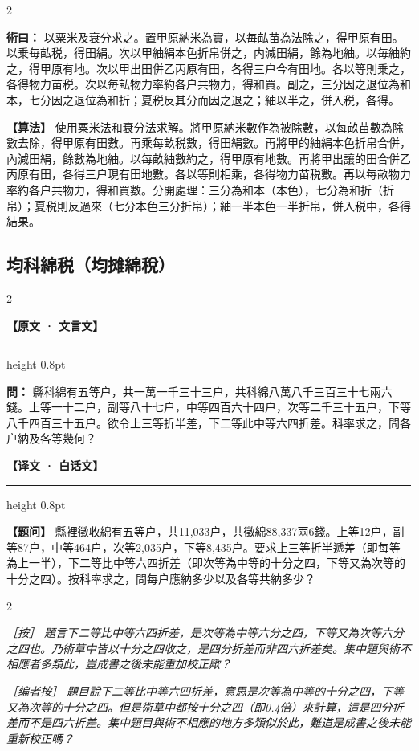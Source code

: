 \documentclass[11pt,a4paper]{article}
\newcommand{\ClassicalQuestion}[1]{\par\noindent\textbf{\color{problemcolor}問：}#1\par}
\newcommand{\ClassicalMethod}[1]{\par\noindent\textbf{\color{methodcolor}術曰：}#1\par}
\newcommand{\ClassicalNote}[1]{\par\noindent\textit{［按］#1}\par}
\newcommand{\ModernQuestion}[1]{\par\noindent\textbf{\color{modernlabel}【题问】}#1\par}
\newcommand{\ModernMethod}[1]{\par\noindent\textbf{\color{methodcolor}【算法】}#1\par}
\newcommand{\ModernNote}[1]{\par\noindent\textit{\color{notecolor}［编者按］#1}\par}
\newcommand{\ClassicalHeader}{%
  \begin{center}\textbf{\color{headerclassical}【原文 · 文言文】}\end{center}
  \vspace{-0.5em}
  \hrule height 0.8pt
  \vspace{0.5em}
}
\newcommand{\ModernHeader}{%
  \begin{center}\textbf{\color{headermodern}【译文 · 白话文】}\end{center}
  \vspace{-0.5em}
  \hrule height 0.8pt
  \vspace{0.5em}
}
\begin{document}
\begin{paracol}{2}

\ClassicalMethod{%
以粟米及衰分求之。置甲原納米為實，以毎畆苗為法除之，得甲原有田。以乗毎畆税，得田絹。次以甲紬絹本色折帛併之，内減田絹，餘為地紬。以毎紬約之，得甲原有地。次以甲出田併乙丙原有田，各得三户今有田地。各以等則乗之，各得物力苗税。次以毎畆物力率約各户共物力，得和買。副之，三分因之退位為和本，七分因之退位為和折；夏税反其分而因之退之；紬以半之，併入税，各得。}

\switchcolumn

\ModernMethod{%
使用粟米法和衰分法求解。將甲原納米數作為被除數，以每畝苗數為除數去除，得甲原有田數。再乘每畝税數，得田絹數。再將甲的紬絹本色折帛合併，內減田絹，餘數為地紬。以每畝紬數約之，得甲原有地數。再將甲出讓的田合併乙丙原有田，各得三户現有田地數。各以等則相乘，各得物力苗税數。再以每畝物力率約各户共物力，得和買數。分開處理：三分為和本（本色），七分為和折（折帛）；夏税則反過來（七分本色三分折帛）；紬一半本色一半折帛，併入税中，各得結果。
}

\end{paracol}

\newpage
\subsection*{\color{sectioncolor}均科綿税（均摊綿稅）}

\begin{paracol}{2}

\ClassicalHeader

\ClassicalQuestion{%
縣科綿有五等户，共一萬一千三十三户，共科綿八萬八千三百三十七兩六錢。上等一十二户，副等八十七户，中等四百六十四户，次等二千三十五户，下等八千四百三十五户。欲令上三等折半差，下二等此中等六四折差。科率求之，問各户納及各等幾何？}

\switchcolumn

\ModernHeader

\ModernQuestion{%
縣裡徵收綿有五等户，共11,033户，共徵綿88,337兩6錢。上等12户，副等87户，中等464户，次等2,035户，下等8,435户。要求上三等折半遞差（即每等為上一半），下二等比中等六四折差（即次等為中等的十分之四，下等又為次等的十分之四）。按科率求之，問每户應納多少以及各等共納多少？
}

\end{paracol}

\begin{paracol}{2}

\ClassicalNote{%
題言下二等比中等六四折差，是次等為中等六分之四，下等又為次等六分之四也。乃術草中皆以十分之四收之，是四分折差而非四六折差矣。集中題與術不相應者多類此，豈成書之後未能重加校正歟？}

\switchcolumn

\ModernNote{%
題目說下二等比中等六四折差，意思是次等為中等的十分之四，下等又為次等的十分之四。但是術草中都按十分之四（即0.4倍）來計算，這是四分折差而不是四六折差。集中題目與術不相應的地方多類似於此，難道是成書之後未能重新校正嗎？
}

\end{paracol}
\end{document}
